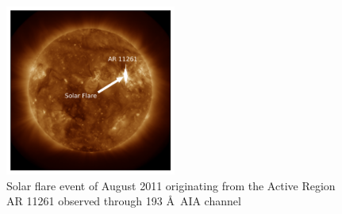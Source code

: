 \message{ !name(main.tex)}\documentclass[12pt]{article}
\begin{document}
\begin{figure}
    \centering
    \includegraphics[width=0.5\textwidth]{images/solar_flare_4_aug_2011.png}
    \caption[Solar flare ( August 2011)]{Solar flare event of  August 2011 originating from the Active Region AR 11261 observed through 193 \AA \ AIA channel}
    \label{fig:solar_flare_4_aug_2011}
\end{figure}
\end{document}
